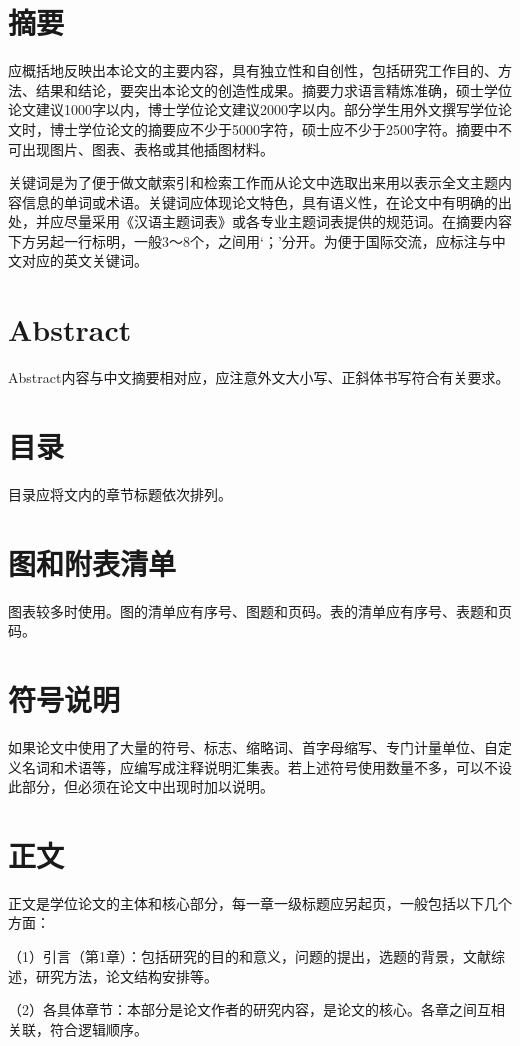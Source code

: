 \section{摘要}
应概括地反映出本论文的主要内容，具有独立性和自创性，包括研究工作目的、方法、结果和结论，要突出本论文的创造性成果。摘要力求语言精炼准确，硕士学位论文建议1000字以内，博士学位论文建议2000字以内。部分学生用外文撰写学位论文时，博士学位论文的摘要应不少于5000字符，硕士应不少于2500字符。摘要中不可出现图片、图表、表格或其他插图材料。

关键词是为了便于做文献索引和检索工作而从论文中选取出来用以表示全文主题内容信息的单词或术语。关键词应体现论文特色，具有语义性，在论文中有明确的出处，并应尽量采用《汉语主题词表》或各专业主题词表提供的规范词。在摘要内容下方另起一行标明，一般3～8个，之间用‘；’分开。为便于国际交流，应标注与中文对应的英文关键词。


\section{Abstract}
Abstract内容与中文摘要相对应，应注意外文大小写、正斜体书写符合有关要求。

\section{目录}
目录应将文内的章节标题依次排列。

\section{图和附表清单}
图表较多时使用。图的清单应有序号、图题和页码。表的清单应有序号、表题和页码。

\section{符号说明}
如果论文中使用了大量的符号、标志、缩略词、首字母缩写、专门计量单位、自定义名词和术语等，应编写成注释说明汇集表。若上述符号使用数量不多，可以不设此部分，但必须在论文中出现时加以说明。

\section{正文}
正文是学位论文的主体和核心部分，每一章一级标题应另起页，一般包括以下几个方面：

（1）引言（第1章）：包括研究的目的和意义，问题的提出，选题的背景，文献综述，研究方法，论文结构安排等。

（2）各具体章节：本部分是论文作者的研究内容，是论文的核心。各章之间互相关联，符合逻辑顺序。

